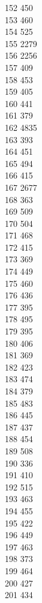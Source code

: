{ 152	450 \\
 153	460 \\
 154	525 \\
 155	2279 \\
 156	2256 \\
 157	409 \\
 158	453 \\
 159	405 \\
 160	441 \\
 161	379 \\
 162	4835 \\
 163	393 \\
 164	451 \\
 165	494 \\
 166	415 \\
 167	2677 \\
 168	363 \\
 169	509 \\
 170	504 \\
 171	468 \\
 172	415 \\
 173	369 \\
 174	449 \\
 175	460 \\
 176	436 \\
 177	395 \\
 178	495 \\
 179	395 \\
 180	406 \\
 181	369 \\
 182	423 \\
 183	474 \\
 184	379 \\
 185	483 \\
 186	445 \\
 187	437 \\
 188	454 \\
 189	508 \\
 190	336 \\
 191	410 \\
 192	515 \\
 193	463 \\
 194	455 \\
 195	422 \\
 196	449 \\
 197	463 \\
 198	373 \\
 199	464 \\
 200	427 \\
 201	434 \\
}
